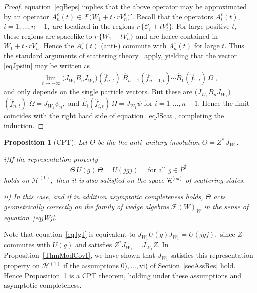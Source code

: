 \documentclass[a4paper,reqno,11pt]{amsart}
\theoremstyle{plain}
\newtheorem{Prop}[Thm]{Proposition}
\theoremstyle{definition}
\numberwithin{equation}{section}
\newcommand{\F}{{\mathcal F}}
\newcommand{\calH}{{\mathcal H}}
\newcommand{\calC}{{\mathcal C}}
\newcommand{\Potild}{\tilde{P}_+^{\uparrow}}
\newcommand{\He}{\calH^{(1)}}
\newcommand{\eps}{\varepsilon}
\newcommand{\ex}{{\rm ex} }
\newcommand{\JWR}{J_{W_1}}  %
\newcommand{\CPTop}{\Theta} %
\newcommand{\cone}{\calC}   %
\begin{document}
\begin{proof}
equation~\eqref{eqBeps} implies that the above operator may be
approximated by an operator $A^\eps_n(t)\in\F\big(W_1+t\cdot rV_n^\eps\big)'.$ 
Recall that the operators $A^\eps_i(t),$ $i=1,\ldots,n-1,$ are localized
in the regions $r\,\{\cone_i+tV_i^\eps\}.$ 
For large positive $t,$ these regions are spacelike to $r\,\{W_1+tV_n^\eps\}$ 
and are hence contained in $W_1+t\cdot rV_n^\eps.$ 
Hence the $A^\eps_i(t)$ (anti-) commute with $A^\eps_n(t)$ for large $t.$ 
Thus the standard arguments of scattering 
theory~\cite{Hepp,DHRIV} apply, yielding that the vector 
\eqref{eqJpsiin} may be written as 
\begin{align*}
\lim_{t\to-\infty} \big(\JWR B_n \JWR\big)(\hat{f}_{n,t}) 
\;\hat{B}_{n-1}(\hat{f}_{n-1,t})\cdots\hat{B}_{1}(\hat{f}_{1,t})\,\Omega\;,
\end{align*}
and only depends on the single particle vectors. 
But these are $\big(\JWR B_n \JWR\big)$ $(\hat{f}_{n,t})$ 
$\Omega=\JWR\psi_{n},$
and $\hat{B}_{i}(\hat{f}_{i,t})\,\Omega=\JWR\psi$ for $i=1,\ldots,n-1.$ 
Hence the limit coincides with the right hand side of 
equation~\eqref{eqJScat}, completing the induction. 
\end{proof}
\begin{Prop}[CPT] \label{CPT} 
Let $\CPTop$ be the the anti--unitary involution $\CPTop\doteq Z^*\,\JWR.$ 

\noindent i)If  the representation property 
\begin{equation} \label{eqJgJ}
 \CPTop\,U(g)\,\CPTop= U(jgj)\quad\text{ for all } g\in\Potild 
\end{equation}
holds on $\He,$ then it is also satisfied on the space $\calH^{(\ex)}$ of 
scattering states. 

\noindent ii) In this case, and if in addition asymptotic completeness holds, 
$\CPTop$ acts geometrically correctly on the family of wedge
algebras $\F(W)_W$ in the sense of equation~\eqref{eqjWj}. 
\end{Prop}
Note that equation~\eqref{eqJgJ} is equivalent to $\JWR U(g)\JWR=U(jgj),$ 
since $Z$ commutes with $U(g)$ and satisfies
$Z^*\JWR=\JWR Z.$ In Proposition~\ref{ThmModCov1}, we have shown that 
$\JWR$ satisfies this representation property on $\He$ if the
assumptions 0)$,\ldots,$vi) of Section~\ref{secAssRes} hold. Hence
Proposition~\ref{CPT} is a CPT theorem, holding under these assumptions and
asymptotic completeness. 
\end{document}
